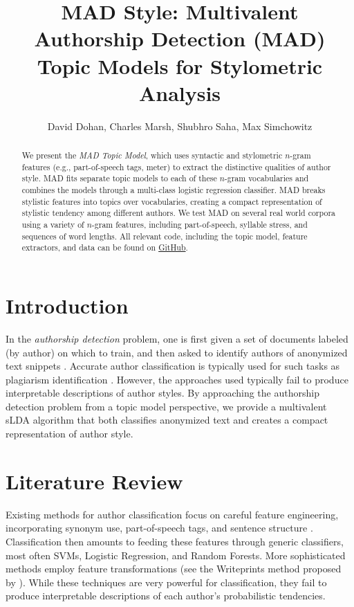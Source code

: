 \documentclass[14pt]{article} %
\title{MAD Style: Multivalent Authorship Detection (MAD) Topic Models for Stylometric Analysis}
\author{David Dohan, Charles Marsh, Shubhro Saha, Max Simchowitz}
\theoremstyle{plain}
\theoremstyle{definition}
\theoremstyle{remark}
\begin{document}
\maketitle
\large
\begin{abstract}
We present the \textit{MAD Topic Model}, which uses  syntactic and stylometric $n$-gram features (e.g., part-of-speech tags, meter) to extract the distinctive qualities of author style. MAD fits separate topic models to each of these $n$-gram vocabularies and combines the models through a multi-class logistic regression classifier. MAD breaks stylistic features into topics over vocabularies, creating a compact representation of stylistic tendency among different authors. We test MAD on several real world corpora using a variety of $n$-gram features, including part-of-speech, syllable stress, and sequences of word lengths. All relevant code, including the topic model, feature extractors, and data can be found on \href{https://github.com/dmrd/mad_topic_model}{GitHub}.
\end{abstract}

\section{Introduction}

In the \textit{authorship detection} problem, one is first given a set of documents labeled (by author) on which to train, and then asked to identify authors of anonymized text snippets \citep{Stein}. Accurate author classification is typically used for such tasks as plagiarism identification \cite{stamatatos2009intrinsic, Stein}. However, the approaches used typically fail to produce interpretable descriptions of author styles. By approaching the authorship detection problem from a topic model perspective, we provide a multivalent sLDA algorithm that both classifies anonymized text and creates a compact representation of author style.

\section{Literature Review}

Existing methods for author classification focus on careful feature engineering, incorporating synonym use, part-of-speech tags, and sentence structure \cite{stamatatos2009survey}. Classification then amounts to feeding these features through generic classifiers, most often SVMs, Logistic Regression, and Random Forests. More sophisticated methods employ feature transformations (see the Writeprints method proposed by \citet{abbasi2008writeprints}). While these techniques are very powerful for classification, they fail to produce interpretable descriptions of each author's probabilistic tendencies.
\end{document}
